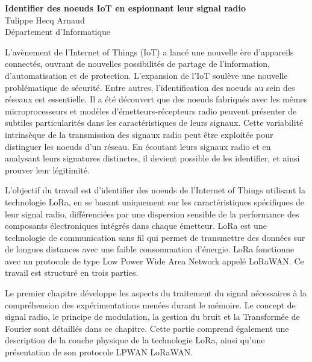 \documentclass[a4paper,11pt]{article}
\begin{document}
\begin{center}
    \LARGE \textbf{Identifier des noeuds IoT en espionnant leur signal radio} \\
    \vspace{0.2cm}
    \large Tulippe Hecq Arnaud \\
    \normalsize Département d'Informatique \\
    \vspace{0.5cm}
\end{center}


\noindent L'avènement de l'Internet of Things (IoT) a lancé une nouvelle ère d'appareils connectés, ouvrant de nouvelles possibilités de partage de l'information, d'automatisation et de protection. L'expansion de l'IoT soulève une nouvelle problématique de sécurité. Entre autres, l'identification des noeuds au sein des réseaux est essentielle. Il a été découvert que des noeuds fabriqués avec les mêmes microprocesseurs et modèles d'émetteurs-récepteurs radio peuvent présenter de subtiles particularités dans les caractéristiques de leurs signaux. Cette variabilité intrinsèque de la transmission des signaux radio peut être exploitée pour distinguer les noeuds d’un réseau. En écoutant leurs signaux radio et en analysant leurs signatures distinctes, il devient possible de les identifier, et ainsi prouver leur légitimité.

\vspace{0.2cm}
\noindent L'objectif du travail est d'identifier des noeuds de l'Internet of Things utilisant la technologie LoRa, en se basant uniquement sur les caractéristiques spécifiques de leur signal radio, différenciées par une dispersion sensible de la performance des composants électroniques intégrés dans chaque émetteur. LoRa est une technologie de communication sans fil qui permet de transmettre des données sur de longues distances avec une faible consommation d'énergie. LoRa fonctionne avec un protocole de type Low Power Wide Area Network appelé LoRaWAN. Ce travail est structuré en trois parties.

\vspace{0.2cm}

\noindent Le premier chapitre développe les aspects du traitement du signal nécessaires à la compréhension des expérimentations menées durant le mémoire. Le concept de signal radio, le principe de modulation, la gestion du bruit et la Transformée de Fourier sont détaillés dans ce chapitre. Cette partie comprend également une description de la couche physique de la technologie LoRa, ainsi qu'une présentation de son protocole LPWAN LoRaWAN.
\end{document}
